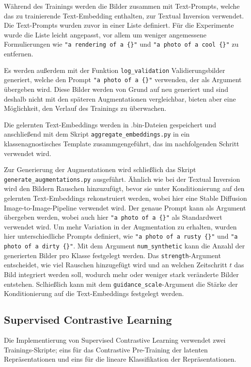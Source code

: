Während des Trainings werden die Bilder zusammen mit Text-Prompts, welche das zu trainierende Text-Embedding enthalten, zur Textual Inversion verwendet. Die Text-Prompts wurden zuvor in einer Liste definiert. Für die Experimente wurde die Liste leicht angepasst, vor allem um weniger angemessene Formulierungen wie \lstinline|"a rendering of a {}"| und \lstinline|"a photo of a cool {}"| zu entfernen.

Es werden außerdem mit der Funktion \lstinline{log_validation} Validierungsbilder generiert, welche den Prompt \lstinline|"a photo of a {}"| verwenden, der als Argument übergeben wird. Diese Bilder werden von Grund auf neu generiert und sind deshalb nicht mit den späteren Augmentationen vergleichbar, bieten aber eine Möglichkeit, den Verlauf des Trainings zu überwachen.

Die gelernten Text-Embeddings werden in .bin-Dateien gespeichert und anschließend mit dem Skript \lstinline{aggregate_embeddings.py} in ein klassenagnostisches Template zusammgengeführt, das im nachfolgenden Schritt verwendet wird.

Zur Generierung der Augmentationen wird schließlich das Skript \lstinline{generate_augmentations.py} ausgeführt. Ähnlich wie bei der Textual Inversion wird den Bildern Rauschen hinzuzufügt, bevor sie unter Konditionierung auf den gelernten Text-Embeddings rekonstruiert werden, wobei hier eine Stable Diffusion Image-to-Image-Pipeline verwendet wird. Der genaue Prompt kann als Argument übergeben werden, wobei auch hier \lstinline|"a photo of a {}"| als Standardwert verwendet wird. Um mehr Variation in der Augmentation zu erhalten, wurden hier unterschiedliche Prompts definiert, wie \lstinline|"a photo of a rusty {}"| und \lstinline|"a photo of a dirty {}"|. Mit dem Argument \lstinline{num_synthetic} kann die Anzahl der generierten Bilder pro Klasse festgelegt werden. Das \lstinline{strength}-Argument entscheidet, wie viel Rauschen hinzugefügt wird und an welchen Zeitschritt $t$ das Bild integriert werden soll, wodurch mehr oder weniger stark veränderte Bilder entstehen. Sclhießlich kann mit dem \lstinline{guidance_scale}-Argument die Stärke der Konditionierung auf die Text-Embeddings festgelegt werden.

\subsection{Supervised Contrastive Learning} \label{subsec:supcon-implementation}

Die Implementierung von Supervised Contrastive Learning verwendet zwei Trainings-Skripte; eins für das Contrastive Pre-Training der latenten Repräsentationen und eins für die lineare Klassifikation der Repräsentationen.

